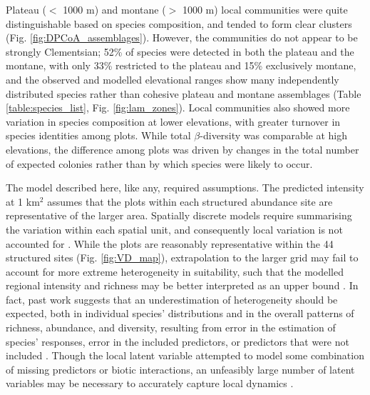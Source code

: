 \documentclass[preprint,final,times,12pt,3p]{elsarticle}
\begin{document}
Plateau ($<$ 1000 m) and montane ($>$ 1000 m) local communities were quite distinguishable based on species composition, and tended to form clear clusters (Fig. \ref{fig:DPCoA_assemblages}). However, the communities do not appear to be strongly Clementsian; 52\% of species were detected in both the plateau and the montane, with only 33\% restricted to the plateau and 15\% exclusively montane, and the observed and modelled elevational ranges show many independently distributed species rather than cohesive plateau and montane assemblages (Table \ref{table:species_list}, Fig. \ref{fig:lam_zones}). Local communities also showed more variation in species composition at lower elevations, with greater turnover in species identities among plots. While total $\beta$-diversity was comparable at high elevations, the difference among plots was driven by changes in the total number of expected colonies rather than by which species were likely to occur.

The model described here, like any, required assumptions. The predicted intensity at 1 km$^2$ assumes that the plots within each structured abundance site are representative of the larger area. Spatially discrete models require summarising the variation within each spatial unit, and consequently local variation is not accounted for \citep{Calabrese2014,Frishkoff2019,AminiTehrani2020}. While the plots are reasonably representative within the 44 structured sites (Fig. \ref{fig:VD_map}), extrapolation to the larger grid may fail to account for more extreme heterogeneity in suitability, such that the modelled regional intensity and richness may be better interpreted as an upper bound \citep{Guillera-Arroita2019,Altwegg2019,Johnston2020}. In fact, past work suggests that an underestimation of heterogeneity should be expected, both in individual species' distributions and in the overall patterns of richness, abundance, and diversity, resulting from error in the estimation of species' responses, error in the included predictors, or predictors that were not included \citep{Calabrese2014,Biber2019,Guillera-Arroita2019}. Though the local latent variable attempted to model some combination of missing predictors or biotic interactions, an unfeasibly large number of latent variables may be necessary to accurately capture local dynamics \citep{Ovaskainen2016}. 
\end{document}

